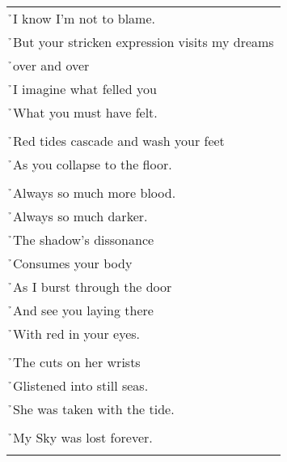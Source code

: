 \documentclass{article}
\begin{document}
\begin{center}
\begin{tabular}{l}
\h{}I know I'm not to blame. \\
\h{}But your stricken expression visits my dreams \\
\h{}over and over \\
\h{}I imagine what felled you \\
\h{}What you must have felt. \\
\\
\h{}Red tides cascade and wash your feet \\
\h{}As you collapse to the floor. \\
\\
\h{}Always so much more blood. \\
\h{}Always so much darker. \\
\h{}The shadow's dissonance \\
\h{}Consumes your body \\
\h{}As I burst through the door \\
\h{}And see you laying there \\
\h{}With red in your eyes. \\
\\
\h{}The cuts on her wrists \\
\h{}Glistened into still seas. \\
\h{}She was taken with the tide. \\
\\
\h{}My Sky was lost forever. \\
\\
\end{tabular}
\end{center}
\end{document}
